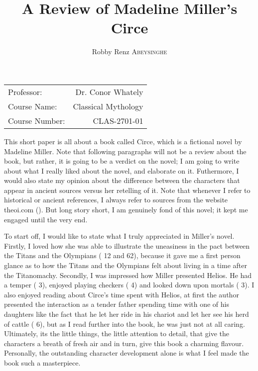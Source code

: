 \documentclass[12pt, a4paper]{article}
\author{Robby Renz \textsc{Abeysinghe}}
\title{A Review of Madeline Miller's Circe}
\begin{document}
\maketitle
\begin{center}
\begin{tabular}{l r}
Professor: & Dr. Conor Whately \\
Course Name: & Classical Mythology \\
Course Number: & CLAS-2701-01
\end{tabular}
\end{center}
\newpage

This short paper is all about a book called Circe, which is a fictional novel by Madeline Miller. Note that following paragraphs will not be a review about the book, but rather, it is going to be a verdict on the novel; I am going to write about what I really liked about the novel, and elaborate on it. Futhermore, I would also state my opinion about the difference between the characters that appear in ancient sources versus her retelling of it. Note that whenever I refer to historical or ancient references, I always refer to sources from the website theoi.com (\cite{theoi}). But long story short, I am genuinely fond of this novel; it kept me engaged until the very end. 

To start off, I would like to state what I truly appreciated in Miller's novel. Firstly, I loved how she was able to illustrate the uneasiness in the pact between the Titans and the Olympians (\cite{miller_circe_2018} 12 and 62), because it gave me a first person glance as to how the Titans and the Olympians felt about living in a time after the Titanomachy. Secondly, I was impressed how Miller presented Helios. He had a temper (\cite{miller_circe_2018} 3), enjoyed playing checkers (\cite{miller_circe_2018} 4) and looked down upon mortals (\cite{miller_circe_2018} 3). I also enjoyed reading about Circe's time spent with Helios, at first the author presented the interaction as a tender father spending time with one of his daughters like the fact that he let her ride in his chariot and let her see his herd of cattle (\cite{miller_circe_2018} 6), but as I read further into the book, he was just not at all caring. Ultimately, its the little things, the little attention to detail, that give the characters a breath of fresh air and in turn, give this book a charming flavour. Personally, the outstanding character development alone is what I feel made the book such a masterpiece.
\end{document}
